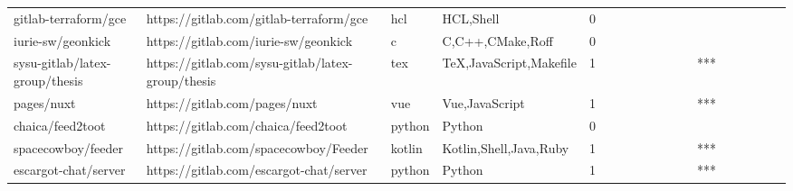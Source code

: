 \begin{tabular}{llllrlllllllllllll}
gitlab-terraform/gce                               &            https://gitlab.com/gitlab-terraform/gce &               hcl &                                          HCL,Shell &       0 &         &        &           &                &                 &        &           &           &          &          &       &              &          \\
iurie-sw/geonkick                                  &               https://gitlab.com/iurie-sw/geonkick &                 c &                                   C,C++,CMake,Roff &       0 &         &        &           &                &                 &        &           &           &          &          &       &              &          \\
sysu-gitlab/latex-group/thesis                     &  https://gitlab.com/sysu-gitlab/latex-group/thesis &               tex &                            TeX,JavaScript,Makefile &       1 &         &        &           &                &                 &        &           &       *** &          &          &       &              &          \\
pages/nuxt                                         &                      https://gitlab.com/pages/nuxt &               vue &                                     Vue,JavaScript &       1 &         &        &           &                &                 &        &           &       *** &          &          &       &              &          \\
chaica/feed2toot                                   &                https://gitlab.com/chaica/feed2toot &            python &                                             Python &       0 &         &        &           &                &                 &        &           &           &          &          &       &              &          \\
spacecowboy/feeder                                 &              https://gitlab.com/spacecowboy/Feeder &            kotlin &                             Kotlin,Shell,Java,Ruby &       1 &         &        &           &                &                 &        &           &       *** &          &          &       &              &          \\
escargot-chat/server                               &            https://gitlab.com/escargot-chat/server &            python &                                             Python &       1 &         &        &           &                &                 &        &           &       *** &          &          &       &              &          \\

\end{tabular}
